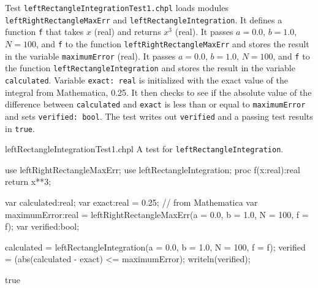\begin{enumspec}
\item{}
Test \lstinline{leftRectangleIntegrationTest1.chpl} loads modules
\lstinline{leftRightRectangleMaxErr} and
\lstinline{leftRectangleIntegration}.
It defines a function \lstinline{f} that takes $x$ (real) and returns $x^3$ (real).
It passes $a=0.0$, $b=1.0$, $N=100$, and \lstinline{f} to the function
\lstinline{leftRightRectangleMaxErr} and stores the result in the variable
\lstinline{maximumError} (real).
It passes $a=0.0$, $b=1.0$, $N=100$, and \lstinline{f} to the function
\lstinline{leftRectangleIntegration} and stores the result in the variable
\lstinline{calculated}.
Variable \lstinline{exact: real} is initialized with the exact value of the integral from
Mathematica, 0.25.
It then checks to see if the absolute value of the difference between \lstinline{calculated} 
and \lstinline{exact} is less than or equal to \lstinline{maximumError} and sets 
\lstinline{verified: bool}. The test writes out \lstinline{verified} and a passing
test results in \lstinline{true}.
\end{enumspec}

\begin{chapelexample}{leftRectangleIntegrationTest1.chpl}
A test for \lstinline{leftRectangleIntegration}.
\begin{chapelpre}
\end{chapelpre}
\begin{chapel}
use leftRightRectangleMaxErr;
use leftRectangleIntegration;
proc f(x:real):real {
  return x**3;
} 
  
var calculated:real;
var exact:real = 0.25;  // from Mathematica
var maximumError:real = leftRightRectangleMaxErr(a = 0.0, b = 1.0, N = 100, f = f);
var verified:bool;

calculated = leftRectangleIntegration(a = 0.0, b = 1.0, N = 100, f = f);
verified = (abs(calculated - exact) <= maximumError);
writeln(verified);
\end{chapel}
\begin{chapelpost}
\end{chapelpost}
\begin{chapeloutput}
true
\end{chapeloutput}
\end{chapelexample}


